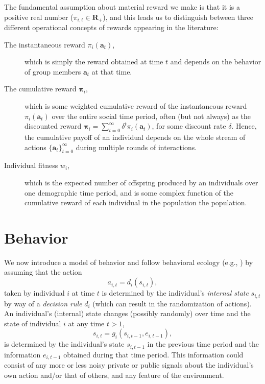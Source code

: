 \documentclass[12pt]{article}
\newcommand{\pa}{\pi}
\begin{document}
The fundamental assumption about material reward we make is that it is a positive real number ($\pa_{i,t} \in \mathbf{R}_{+}$), and this leads us to distinguish between three different operational concepts of rewards appearing in the literature:
\begin{description}
\item[The instantaneous reward $\pa_i(\mathbf{a}_t)$,] which is simply the reward obtained at time $t$ and depends on the behavior of group members $ \mathbf{a}_t$ at that time.

\item[The cumulative reward $\boldsymbol{\pa}_{i}$,] which is some weighted cumulative reward of the instantaneous reward $\pa_i(\mathbf{a}_t)$ over the entire social time period, often (but not always) as the discounted reward $\boldsymbol{\pa}_{i}=\sum^\infty_{t=0}\delta^t\pa_i(\mathbf{a}_t)$, for some discount rate $\delta$. Hence, the cumulative payoff of an individual depends on the whole stream of actions $\{\mathbf{a}_t \}^\infty_{t=0}$ during multiple rounds of interactions.

\item[Individual fitness $w_i$,] which is the expected number of offspring produced by an individuals over one demographic time period, and is some complex function of the cumulative reward of each individual in the population the population.
\end{description}

\section*{Behavior}

We now introduce a model of behavior and follow behavioral ecology (e.g., %
\citealp{McFarlandH81,Leimar97,EnquistG05}) by assuming that the action \begin{equation}
a_{i,t}=d_{i}(s_{i,t}),  \label{behavmap}
\end{equation}%
taken by individual $i$ at time $t$ is determined by the individual's \emph{internal state} $%
s_{i,t}$ by way of a \emph{decision rule} $d_{i}$ (which can result in the randomization of actions). An individual's (internal) state changes (possibly randomly) over time
and the state of individual $i$ at any time $t>1$, 
\begin{equation}
s_{i,t}=g_{i}(s_{i,t-1},e_{i,t-1}),  \label{transition}
\end{equation}
is determined by the individual's state $s_{i,t-1}$ in the
previous time period and the information $e_{i,t-1}$ obtained during
that time period. This information could consist of any more or less noisy private
or public signals about the individual's own action and/or that of others, and any feature of the environment. 
\end{document}

